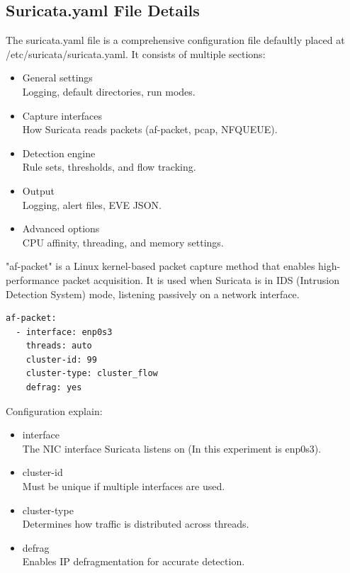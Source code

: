 \subsection{Suricata.yaml File Details}
The suricata.yaml file is a comprehensive configuration file defaultly placed at /etc/suricata/suricata.yaml. It consists of multiple sections:
\begin{itemize}
    \item General settings \\
    Logging, default directories, run modes.
    \item Capture interfaces \\
    How Suricata reads packets (af-packet, pcap, NFQUEUE).
    \item Detection engine \\
    Rule sets, thresholds, and flow tracking.
    \item Output \\
    Logging, alert files, EVE JSON.
    \item Advanced options \\
     CPU affinity, threading, and memory settings.
\end{itemize}
"af-packet" is a Linux kernel-based packet capture method that enables high-performance packet acquisition. It is used when Suricata is in IDS (Intrusion Detection System) mode, listening passively on a network interface.
\begin{lstlisting}[language=bash,caption={Part contains af-packet}]
af-packet:
  - interface: enp0s3
    threads: auto
    cluster-id: 99
    cluster-type: cluster_flow
    defrag: yes
\end{lstlisting}
Configuration explain:
\begin{itemize}
    \item interface \\
    The NIC interface Suricata listens on (In this experiment is enp0s3).
    \item cluster-id \\
    Must be unique if multiple interfaces are used.
    \item cluster-type \\
    Determines how traffic is distributed across threads.
    \item defrag \\
    Enables IP defragmentation for accurate detection.
\end{itemize}
